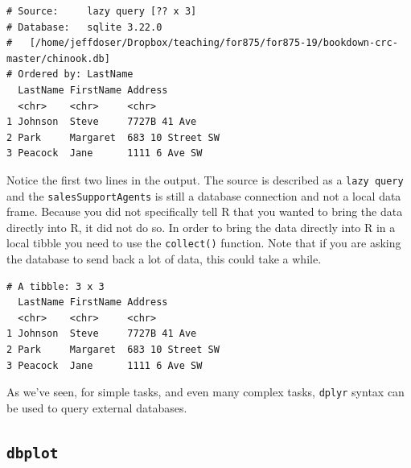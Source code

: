 \documentclass[]{krantz}
\makeatletter
\newenvironment{Shaded}{\begin{snugshade}}{\end{snugshade}}
\newcommand{\KeywordTok}[1]{\textcolor[rgb]{0.27,0.27,0.27}{\textbf{#1}}}
\newcommand{\StringTok}[1]{\textcolor[rgb]{0.5,0.5,0.5}{#1}}
\newcommand{\OperatorTok}[1]{\textcolor[rgb]{0.43,0.43,0.43}{\textbf{#1}}}
\newcommand{\NormalTok}[1]{#1}
\newenvironment{kframe}{%
\medskip{}
\setlength{\fboxsep}{.8em}
 \def\at@end@of@kframe{}%
 \ifinner\ifhmode%
  \def\at@end@of@kframe{\end{minipage}}%
  \begin{minipage}{\columnwidth}%
 \fi\fi%
 \def\FrameCommand##1{\hskip\@totalleftmargin \hskip-\fboxsep
 \colorbox{shadecolor}{##1}\hskip-\fboxsep
     \hskip-\linewidth \hskip-\@totalleftmargin \hskip\columnwidth}%
 \MakeFramed {\advance\hsize-\width
   \@totalleftmargin\z@ \linewidth\hsize
   \@setminipage}}%
 {\par\unskip\endMakeFramed%
 \at@end@of@kframe}
\renewenvironment{Shaded}{\begin{kframe}}{\end{kframe}}
\makeatother
\begin{document}
\begin{verbatim}
# Source:     lazy query [?? x 3]
# Database:   sqlite 3.22.0
#   [/home/jeffdoser/Dropbox/teaching/for875/for875-19/bookdown-crc-master/chinook.db]
# Ordered by: LastName
  LastName FirstName Address         
  <chr>    <chr>     <chr>           
1 Johnson  Steve     7727B 41 Ave    
2 Park     Margaret  683 10 Street SW
3 Peacock  Jane      1111 6 Ave SW   
\end{verbatim}

Notice the first two lines in the output. The source is described as a
\texttt{lazy\ query} and the \texttt{salesSupportAgents} is still a
database connection and not a local data frame. Because you did not
specifically tell R that you wanted to bring the data directly into R,
it did not do so. In order to bring the data directly into R in a local
tibble you need to use the \texttt{collect()} function. Note that if you
are asking the database to send back a lot of data, this could take a
while.

\begin{Shaded}
\end{Shaded}

\begin{verbatim}
# A tibble: 3 x 3
  LastName FirstName Address         
  <chr>    <chr>     <chr>           
1 Johnson  Steve     7727B 41 Ave    
2 Park     Margaret  683 10 Street SW
3 Peacock  Jane      1111 6 Ave SW   
\end{verbatim}

As we've seen, for simple tasks, and even many complex tasks,
\texttt{dplyr} syntax can be used to query external databases.

\subsection{\texorpdfstring{\texttt{dbplot}}{dbplot}}\label{dbplot}
\end{document}
